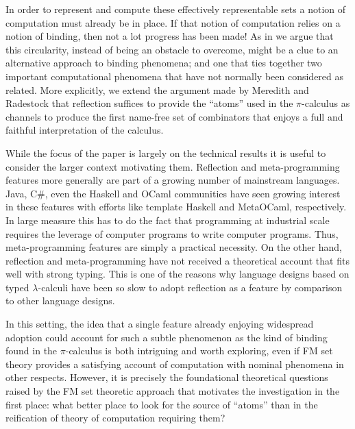 \documentclass{llncs}
\newcommand{\pic}{$\pi$-calculus}
\begin{document}
In order to represent and compute these effectively representable sets
a notion of computation must already be in place. If that notion of
computation relies on a notion of binding, then not a lot progress has
been made! As in \cite{DBLP:journals/entcs/MeredithR05} we argue that
this circularity, instead of being an obstacle to overcome, might be a
clue to an alternative approach to binding phenomena; and one that
ties together two important computational phenomena that have not
normally been considered as related. More explicitly, we extend the
argument made by Meredith and Radestock that reflection suffices to
provide the ``atoms'' used in the {\pic} as channels to produce the
first name-free set of combinators that enjoys a full and faithful
interpretation of the calculus.

While the focus of the paper is largely on the technical results it is
useful to consider the larger context motivating them. Reflection and
meta-programming features more generally are part of a growing number
of mainstream languages. Java, C\#, even the Haskell and OCaml
communities have seen growing interest in these features with efforts
like template Haskell and MetaOCaml, respectively. In large measure
this has to do the fact that programming at industrial scale requires
the leverage of computer programs to write computer programs. Thus,
meta-programming features are simply a practical necessity. On the
other hand, reflection and meta-programming have not received a
theoretical account that fits well with strong typing. This is one of
the reasons why language designs based on typed $\lambda$-calculi have
been so slow to adopt reflection as a feature by comparison to other
language designs.

In this setting, the idea that a single feature already enjoying
widespread adoption could account for such a subtle phenomenon as the
kind of binding found in the {\pic} is both intriguing and worth
exploring, even if FM set theory provides a satisfying account of
computation with nominal phenomena in other respects. However, it is
precisely the foundational theoretical questions raised by the FM set
theoretic approach that motivates the investigation in the first place:
what better place to look for the source of ``atoms'' than in the
reification of theory of computation requiring them? 
\end{document}
